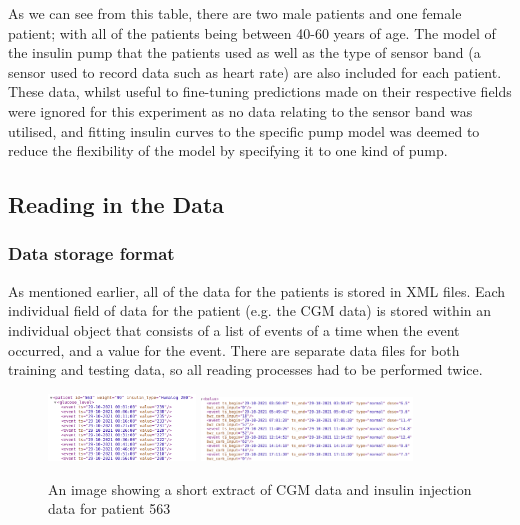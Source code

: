       As we can see from this table, there are two male patients and one female patient; with all of the patients being between 40-60 years of age. The model of the insulin pump that the patients used as well as the type of sensor band (a sensor used to record data such as heart rate) are also included for each patient. These data, whilst useful to fine-tuning predictions made on their respective fields were ignored for this experiment as no data relating to the sensor band was utilised, and fitting insulin curves to the specific pump model was deemed to reduce the flexibility of the model by specifying it to one kind of pump.

      \subsection{Reading in the Data}

        \subsubsection{Data storage format}
          As mentioned earlier, all of the data for the patients is stored in XML files. Each individual field of data for the patient (e.g. the CGM data) is stored within an individual object that consists of a list of events of a time when the event occurred, and a value for the event. There are separate data files for both training and testing data, so all reading processes had to be performed twice.

          \begin{figure}[H]
            \centering
            \includegraphics[width=0.35\textwidth]{images/XMlFile.png} 
            \includegraphics[width=0.5\textwidth]{images/InsulinXML.png} 
            \caption{
             An image showing a short extract of CGM data and insulin injection data for patient 563
            }
          \end{figure}
          
